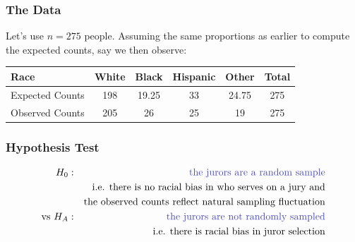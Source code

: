 \documentclass[handout]{beamer}
\newcommand{\blue}[1]{\textcolor{blue2}{#1}}
\begin{document}
\begin{frame}[fragile]
\frametitle{The Data}

Let's use $n=275$ people.  Assuming the same proportions as earlier to compute the \blue{expected} counts, say we then observe:

\begin{center}
\begin{tabular}{l||cccc|c}
Race & White & Black & Hispanic & Other & Total \\ 
\hline
Expected Counts & 198 & 19.25 & 33 & 24.75 & 275\\ 
\pause Observed Counts & 205 & 26 & 25 & 19 & 275\\ 
\end{tabular}
\end{center}

\end{frame}


\begin{frame}[fragile]
\frametitle{Hypothesis Test}
\begin{eqnarray*}
H_0:&& \mbox{\blue{the jurors are a random sample}}\\
&& \mbox{i.e. there is no racial bias in who serves on a jury and}\\
&& \mbox{the observed counts reflect natural sampling fluctuation}\\
\mbox{vs } H_A:&& \mbox{\blue{the jurors are not randomly sampled}}\\
&& \mbox{i.e. there is racial bias in juror selection}
\end{eqnarray*}
\end{frame}
\end{document}
